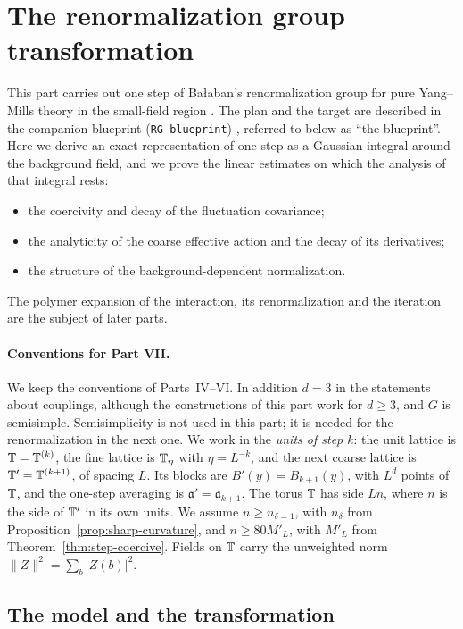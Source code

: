\section{The renormalization group transformation}\label{sec:rg-step}

This part carries out one step of Ba\l aban's renormalization group for pure Yang--Mills theory in the small-field region \cite{BalUV3}. The plan and the target are described in the companion blueprint (\texttt{RG-blueprint}) \cite{Blueprint}, referred to below as ``the blueprint''. Here we derive an exact representation of one step as a Gaussian integral around the background field, and we prove the linear estimates on which the analysis of that integral rests:
\begin{itemize}
\item the coercivity and decay of the fluctuation covariance;
\item the analyticity of the coarse effective action and the decay of its derivatives;
\item the structure of the background-dependent normalization.
\end{itemize}
The polymer expansion of the interaction, its renormalization and the iteration are the subject of later parts.

\paragraph{Conventions for Part VII.} We keep the conventions of Parts~IV--VI. In addition $d=3$ in the statements about couplings, although the constructions of this part work for $d\ge3$, and $G$ is semisimple. Semisimplicity is not used in this part; it is needed for the renormalization in the next one. We work in the \emph{units of step $k$}: the unit lattice is $\mathbb T=\mathbb T^{(k)}$, the fine lattice is $\mathbb T_\eta$ with $\eta=L^{-k}$, and the next coarse lattice is $\mathbb T'=\mathbb T^{(k+1)}$, of spacing $L$. Its blocks are $B'(y)=B_{k+1}(y)$, with $L^d$ points of $\mathbb T$, and the one-step averaging is $\mathfrak a'=\mathfrak a_{k+1}$. The torus $\mathbb T$ has side $Ln$, where $n$ is the side of $\mathbb T'$ in its own units. We assume $n\ge n_{\delta=1}$, with $n_\delta$ from Proposition~\ref{prop:sharp-curvature}, and $n\ge80M'_L$, with $M'_L$ from Theorem~\ref{thm:step-coercive}. Fields on $\mathbb T$ carry the unweighted norm $\|Z\|^2=\sum_b|Z(b)|^2$.

\subsection{The model and the transformation}

